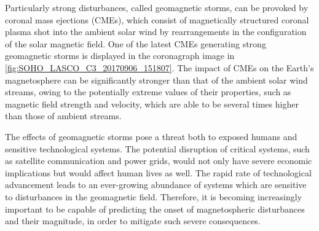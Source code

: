 Particularly strong disturbances, called geomagnetic storms, can be provoked by coronal mass ejections (CMEs), which consist of magnetically structured coronal plasma shot into the ambient solar wind by rearrangements in the configuration of the solar magnetic field. One of the latest CMEs generating strong geomagnetic storms is displayed in the coronagraph image in \autoref{fig:SOHO_LASCO_C3_20170906_151807}. The impact of CMEs on the Earth's magnetosphere can be significantly stronger than that of the ambient solar wind streams, owing to the potentially extreme values of their properties, such as magnetic field strength and velocity, which are able to be several times higher than those of ambient streams.
\begin{figure}[htb]
\end{figure}

The effects of geomagnetic storms pose a threat both to exposed humans and sensitive technological systems. The potential disruption of critical systems, such as satellite communication and power grids, would not only have severe economic implications but would affect human lives as well. The rapid rate of technological advancement leads to an ever-growing abundance of systems which are sensitive to disturbances in the geomagnetic field. Therefore, it is becoming increasingly important to be capable of predicting the onset of magnetospheric disturbances and their magnitude, in order to mitigate such severe consequences.

